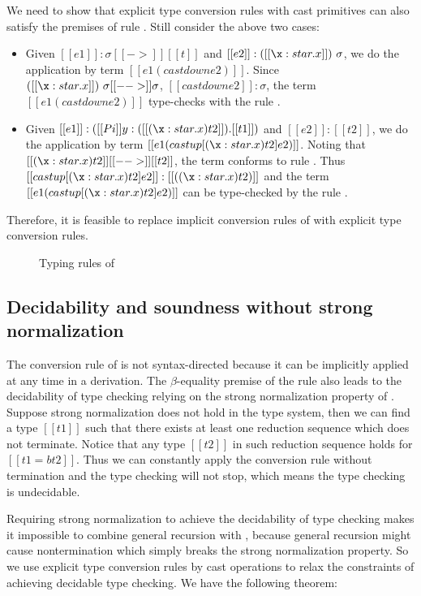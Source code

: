We need to show that explicit type conversion rules with cast primitives can also satisfy the premises of rule . Still consider the above two cases:
\begin{itemize}
\item Given $[[e1]]:\sigma [[->]] [[t]]$ and $[[e2]] : ([[\x:star.x]])~\sigma$, we do the application by term $[[e1 (castdown e2)]]$. Since $([[\x:star.x]])~\sigma [[-->]] \sigma$, $[[castdown e2]] : \sigma$, the term $[[e1 (castdown e2)]]$ type-checks with the rule .
\item Given $[[e1]] : ([[Pi]] y:([[(\x : star . x) t2]]).[[t1]])$ and $[[e2]] : [[t2]]$, we do the application by term $[[e1 (castup [ (\x : star . x) t2 ] e2)]]$. Noting that $[[(\x : star . x) t2]] [[-->]] [[t2]]$, the term conforms to rule . Thus $[[castup [ (\x : star . x) t2 ] e2]] : [[((\x : star . x) t2)]]$ and the term $[[e1 (castup [ (\x : star . x) t2 ] e2)]]$ can be type-checked by the rule .
\end{itemize}

Therefore, it is feasible to replace implicit conversion rules of \cc with explicit type conversion rules.

\begin{figure}[ht]
	\ottdefnexpr{}
	\caption{Typing rules of \expcc}
	\label{fig:ecc:typerule}
\end{figure}

\subsection{Decidability and soundness without strong normalization}\label{sec:ecc:sound}
The conversion rule of \cc is not syntax-directed because it can be implicitly applied at any time in a derivation. The $\beta$-equality premise of the rule also leads to the decidability of type checking relying on the strong normalization property of \cc. Suppose strong normalization does not hold in the type system, then we can find a type $[[t1]]$ such that there exists at least one reduction sequence which does not terminate. Notice that any type $[[t2]]$ in such reduction sequence holds for $[[t1 =b t2]]$. Thus we can constantly apply the conversion rule without termination and the type checking will not stop, which means the type checking is undecidable.

Requiring strong normalization to achieve the decidability of type checking makes it impossible to combine general recursion with \cc, because general recursion might cause nontermination which simply breaks the strong normalization property. So we use explicit type conversion rules by cast operations to relax the constraints of achieving decidable type checking. We have the following theorem:

